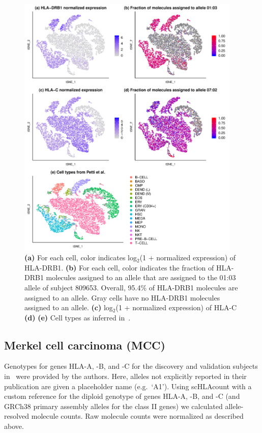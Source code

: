\documentclass{article}[12pt]
\begin{document}
\begin{figure}
\includegraphics[width=0.95\textwidth]{figures/figure2-updated.pdf}
\caption{ \textbf{(a)} For each cell, color indicates log$_2$(1 + normalized expression) of HLA-DRB1. \textbf{(b)} For each cell, color indicates the fraction of HLA-DRB1 molecules assigned to an allele that are assigned to the 01:03 allele of subject 809653. Overall, 95.4\% of HLA-DRB1 molecules are assigned to an allele. Gray cells have no HLA-DRB1 molecules assigned to an allele. \textbf{(c)} log$_2$(1 + normalized expression) of HLA-C \textbf{(d)} \textbf{(e)} Cell types as inferred in~\parencite{Petti2019}.}
\label{fig:amldrb1}
\end{figure}

\subsection*{Merkel cell carcinoma (MCC)}

Genotypes for genes HLA-A, -B, and -C for the discovery and validation subjects in~\parencite{Paulson2018} were provided by the authors. Here, alleles not explicitly reported in their publication are given a placeholder name (e.g.~`A1'). Using scHLAcount with a custom reference for the diploid genotype of genes HLA-A, -B, and -C (and GRCh38 primary assembly alleles for the class II genes) we calculated allele-resolved molecule counts. Raw molecule counts were normalized as described above. 
\end{document}
